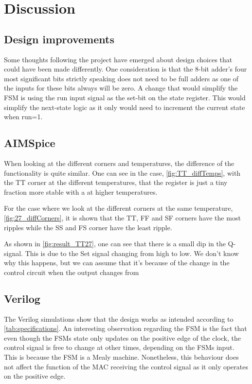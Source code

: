 \section{Discussion}
\label{sec: Discussion}

\subsection{Design improvements}

Some thoughts following the project have emerged about design choices that could have been made differently. One consideration is that the 8-bit adder's four most significant bits strictly speaking does not need to be full adders as one of the inputs for these bits always will be zero. A change that would simplify the FSM is using the run input signal as the set-bit on the state register. This would simplify the next-state logic as it only would need to increment the current state when run=1.

\subsection{AIMSpice}

When looking at the different corners and temperatures, the difference of the functionality is quite similar. One can see in the case, \autoref{fig:TT_diffTemps}, with the TT corner at the different temperatures, that the register is just a tiny fraction more stable with a at higher temperatures.

For the case where we look at the different corners at the same temperature, \autoref{fig:27_diffCorners}, it is shown that the TT, FF and SF corners have the most ripples while the SS and FS corner have the least ripple.

As shown in \autoref{fig:result_TT27}, one can see that there is a small dip in the Q-signal. This is due to the Set signal changing from high to low. We don't know why this happens, but we can assume that it's because of the change in the control circuit when the output changes from 

\subsection{Verilog}

The Verilog simulations show that the design works as intended according to \autoref{tab:specifications}.
An interesting observation regarding the FSM is the fact that even though the FSMs state only updates on the positive edge of the clock, the control signal is free to change at other times, depending on the FSMs input. This is because the FSM is a Mealy machine. Nonetheless, this behaviour does not affect the function of the MAC receiving the control signal as it only operates on the positive edge.

